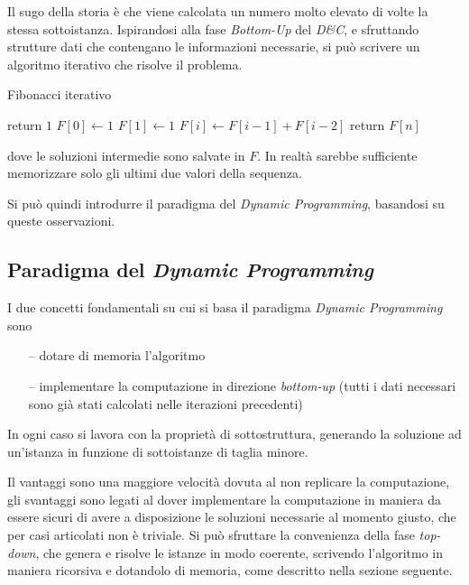 Il sugo della storia è che viene calcolata un numero molto elevato di volte la stessa sottoistanza. Ispirandosi alla fase \emph{Bottom-Up} del \emph{D\&C}, e sfruttando strutture dati che contengano le informazioni necessarie, si può scrivere un algoritmo iterativo che risolve il problema.
\begin{algorithm}[H]
\caption{Fibonacci iterativo}\label{alg:itfib}
\begin{algorithmic}[1]
            \State return $1$
        \EndIf
        \State $F[0] \gets 1$
        \State $F[1] \gets 1$
            \State $F[i] \gets F[i-1] + F[i-2]$
        \EndFor
        \State return $F[n]$
    \EndProcedure
\end{algorithmic}
\end{algorithm}
\noindent
dove le soluzioni intermedie sono salvate in $F$. In realtà sarebbe sufficiente memorizzare solo gli ultimi due valori della sequenza.

Si può quindi introdurre il paradigma del \emph{Dynamic Programming}, basandosi su queste osservazioni.

\subsection{Paradigma del \emph{Dynamic Programming}}
I due concetti fondamentali su cui si basa il paradigma \emph{Dynamic Programming} sono
\begin{itemize}[noitemsep,topsep=0pt,parsep=0pt,partopsep=0pt]
    \item[--] dotare di memoria l'algoritmo
    \item[--] implementare la computazione in direzione \emph{bottom-up} (tutti i dati necessari sono già stati calcolati nelle iterazioni precedenti)
\end{itemize}
In ogni caso si lavora con la proprietà di sottostruttura, generando la soluzione ad un'istanza in funzione di sottoistanze di taglia minore.

Il vantaggi sono una maggiore velocità dovuta al non replicare la computazione, gli svantaggi sono legati al dover implementare la computazione in maniera da essere sicuri di avere a disposizione le soluzioni necessarie al momento giusto, che per casi articolati non è triviale. Si può sfruttare la convenienza della fase \emph{top-down}, che genera e risolve le istanze in modo coerente, scrivendo l'algoritmo in maniera ricorsiva e dotandolo di memoria, come descritto nella sezione seguente.

